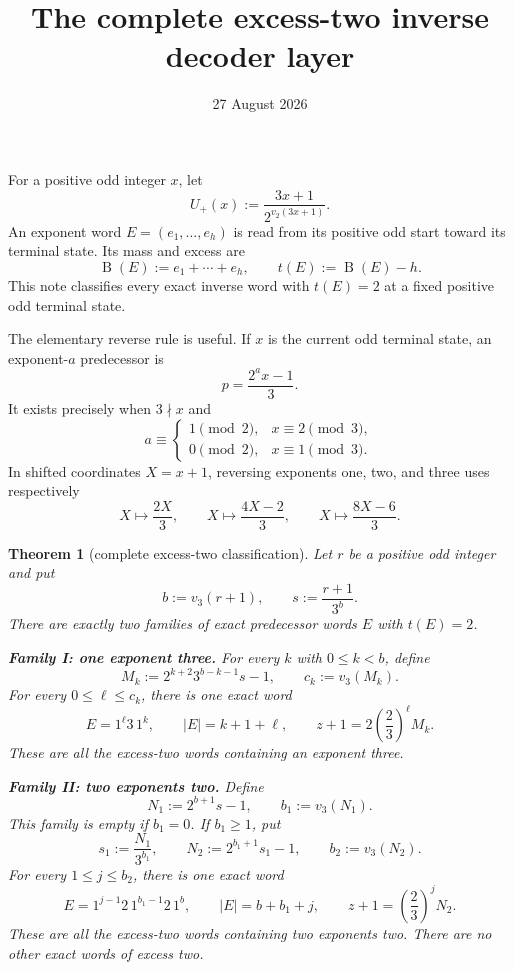 \documentclass[11pt]{article}
\title{The complete excess-two inverse decoder layer}
\author{}
\date{27 August 2026}
\newtheorem{theorem}{Theorem}
\newcommand{\Up}{U_+}
\newcommand{\mass}{\operatorname{B}}
\begin{document}
\maketitle

For a positive odd integer $x$, let
\[
 \Up(x):=\frac{3x+1}{2^{v_2(3x+1)}}.
 \tag{1}
\]
An exponent word $E=(e_1,\ldots,e_h)$ is read from its positive odd
start toward its terminal state.  Its mass and excess are
\[
 \mass(E):=e_1+\cdots+e_h,
 \qquad t(E):=\mass(E)-h.
 \tag{2}
\]
This note classifies every exact inverse word with $t(E)=2$ at a fixed
positive odd terminal state.

The elementary reverse rule is useful.  If $x$ is the current odd
terminal state, an exponent-$a$ predecessor is
\[
 p=\frac{2^a x-1}{3}.
 \tag{3}
\]
It exists precisely when $3\nmid x$ and
\[
 a\equiv
 \begin{cases}
 1\pmod2,&x\equiv2\pmod3,\\
 0\pmod2,&x\equiv1\pmod3.
 \end{cases}
 \tag{4}
\]
In shifted coordinates $X=x+1$, reversing exponents one, two, and three
uses respectively
\[
 X\longmapsto\frac{2X}{3},
 \qquad
 X\longmapsto\frac{4X-2}{3},
 \qquad
 X\longmapsto\frac{8X-6}{3}.
 \tag{5}
\]

\begin{theorem}[complete excess-two classification]
Let $r$ be a positive odd integer and put
\[
 b:=v_3(r+1),
 \qquad s:=\frac{r+1}{3^b}.
 \tag{6}
\]
There are exactly two families of exact predecessor words $E$ with
$t(E)=2$.

\medskip
\noindent\textbf{Family I: one exponent three.}
For every $k$ with $0\leq k<b$, define
\[
 M_k:=2^{k+2}3^{b-k-1}s-1,
 \qquad c_k:=v_3(M_k).
 \tag{7}
\]
For every $0\leq\ell\leq c_k$, there is one exact word
\[
 \boxed{
 E=1^\ell3\,1^k,
 \qquad |E|=k+1+\ell,
 \qquad z+1=2\left(\frac23\right)^\ell M_k.}
 \tag{8}
\]
These are all the excess-two words containing an exponent three.

\medskip
\noindent\textbf{Family II: two exponents two.}
Define
\[
 N_1:=2^{b+1}s-1,
 \qquad b_1:=v_3(N_1).
 \tag{9}
\]
This family is empty if $b_1=0$.  If $b_1\geq1$, put
\[
 s_1:=\frac{N_1}{3^{b_1}},
 \qquad N_2:=2^{b_1+1}s_1-1,
 \qquad b_2:=v_3(N_2).
 \tag{10}
\]
For every $1\leq j\leq b_2$, there is one exact word
\[
 \boxed{
 E=1^{j-1}2\,1^{b_1-1}2\,1^b,
 \qquad |E|=b+b_1+j,
 \qquad z+1=\left(\frac23\right)^jN_2.}
 \tag{11}
\]
These are all the excess-two words containing two exponents two.
There are no other exact words of excess two.
\end{theorem}
\end{document}
